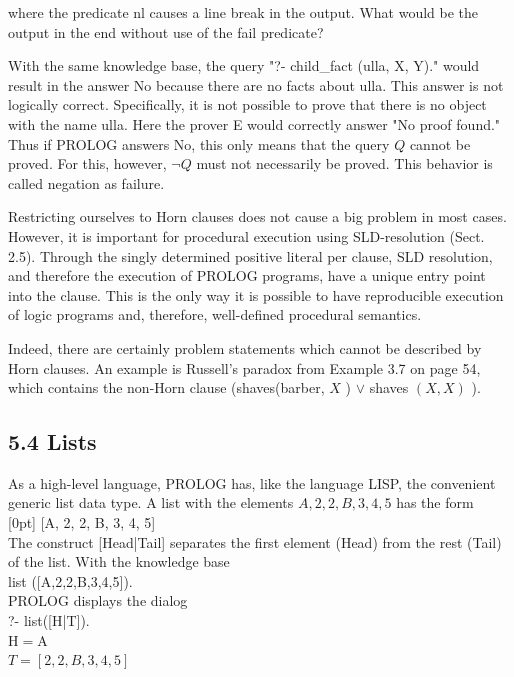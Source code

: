 \documentclass[10pt]{book}
\begin{document}
\begin{center}
where the predicate nl causes a line break in the output. What would be the output in the end without use of the fail predicate?

With the same knowledge base, the query "?- child\_fact (ulla, X, Y)." would result in the answer No because there are no facts about ulla. This answer is not logically correct. Specifically, it is not possible to prove that there is no object with the name ulla. Here the prover E would correctly answer "No proof found." Thus if PROLOG answers No, this only means that the query $Q$ cannot be proved. For this, however, $\neg Q$ must not necessarily be proved. This behavior is called negation as failure.

Restricting ourselves to Horn clauses does not cause a big problem in most cases. However, it is important for procedural execution using SLD-resolution (Sect. 2.5). Through the singly determined positive literal per clause, SLD resolution, and therefore the execution of PROLOG programs, have a unique entry point into the clause. This is the only way it is possible to have reproducible execution of logic programs and, therefore, well-defined procedural semantics.

Indeed, there are certainly problem statements which cannot be described by Horn clauses. An example is Russell's paradox from Example 3.7 on page 54, which contains the non-Horn clause (shaves(barber, $X$ ) $\vee$ shaves $(X, X)$ ).

\subsection*{5.4 Lists}
As a high-level language, PROLOG has, like the language LISP, the convenient generic list data type. A list with the elements $A, 2,2, B, 3,4,5$ has the form\\
[0pt]
[A, 2, 2, B, 3, 4, 5]\\[0pt]
The construct [Head|Tail] separates the first element (Head) from the rest (Tail) of the list. With the knowledge base\\[0pt]
list ([A,2,2,B,3,4,5]).\\
PROLOG displays the dialog\\[0pt]
?- list([H|T]).\\
$\mathrm{H}=\mathrm{A}$\\
$T=[2,2, B, 3,4,5]$


\end{center}
\end{document}
